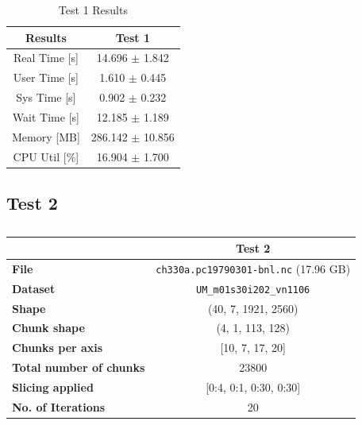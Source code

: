 \documentclass{article}
\begin{document}
\begin{table}[h!]
    \centering
    \begin{tabular}{cc}
        \hline
        \textbf{Results} & Test 1              \\ \hline
        Real Time [s]    & 14.696 $\pm$ 1.842   \\
        User Time [s]    & 1.610  $\pm$ 0.445   \\
        Sys Time [s]     & 0.902  $\pm$ 0.232   \\
        Wait Time [s]    & 12.185 $\pm$ 1.189   \\
        Memory [MB]      & 286.142 $\pm$ 10.856 \\
        CPU Util [\%]    & 16.904 $\pm$ 1.700   \\
        \hline
    \end{tabular}
    \caption{Test 1 Results}
    \label{tab:T1_Results}
\end{table}

\subsection{Test 2}
\begin{table}[h!] 
    \centering 
    \begin{tabular}{lc}  \hline
                                        & Test 2                                          \\ \hline
        \textbf{File}                   & \texttt{ch330a.pc19790301-bnl.nc}  (17.96  GB)  \\  
        \textbf{Dataset}                &  \texttt{UM\_m01s30i202\_vn1106}                \\ 
        \textbf{Shape}                  &  (40, 7, 1921, 2560)                            \\ 
        \textbf{Chunk shape}            &  (4, 1, 113, 128)                               \\ 
        \textbf{Chunks per axis}        &  [10, 7, 17, 20]                                \\ 
        \textbf{Total number of chunks} &    23800                                        \\ 
        \textbf{Slicing applied}        & [0:4, 0:1, 0:30, 0:30]                          \\ 
        \textbf{No. of Iterations}      &  20                                             \\  \hline
    \end{tabular} 
    \caption{} 
    \label{tab:T2_Conditions} 
\end{table}
\end{document}
